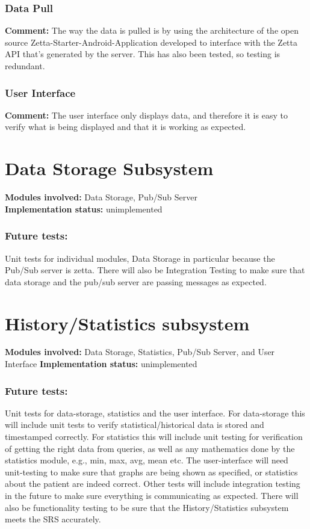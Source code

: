 \documentclass[12pt]{article}
\begin{document}
{	\subsubsection{Data Pull}
	\textbf{Comment:} The way the data is pulled is by using the architecture of the open source Zetta-Starter-Android-Application developed to interface with the Zetta API that's generated by the server. This has also been tested, so testing is redundant.
	\subsubsection{User Interface}
	\textbf{Comment:} The user interface only displays data, and therefore it is easy to verify what is being displayed and that it is working as expected.

	\section{Data Storage Subsystem}
	\textbf{Modules involved: } Data Storage, Pub/Sub Server \\
	\textbf{Implementation status:} unimplemented \\
	\subsubsection{Future tests:} Unit tests for individual modules, Data Storage in particular because the Pub/Sub server is zetta. There will also be Integration Testing to make sure that data storage and the pub/sub server are passing messages as expected. 

	\section{History/Statistics subsystem}
	\textbf{Modules involved:} Data Storage, Statistics, Pub/Sub Server, and User Interface
	\textbf{Implementation status:} unimplemented
	\subsubsection{Future tests:} Unit tests for data-storage, statistics and the user interface. For data-storage this will include unit tests to verify statistical/historical data is stored and timestamped correctly. For statistics this will include unit testing for verification of getting the right data from queries, as well as any mathematics done by the statistics module, e.g., min, max, avg, mean etc. The user-interface will need unit-testing to make sure that graphs are being shown as specified, or statistics about the patient are indeed correct. Other tests will include integration testing in the future to make sure everything is communicating as expected. There will also be functionality testing to be sure that the History/Statistics subsystem meets the SRS accurately. 

}
\end{document}
